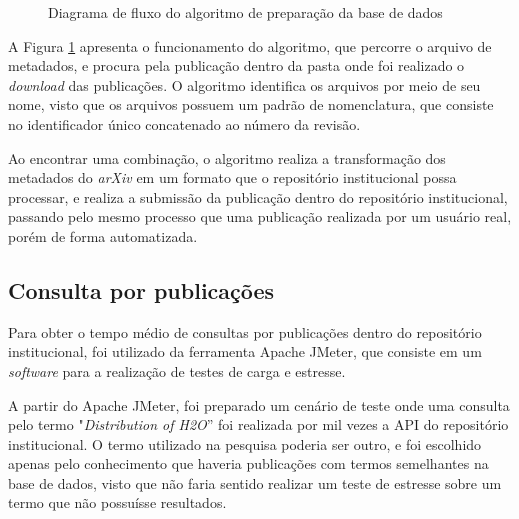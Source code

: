 \begin{figure}[H]
    \caption{Diagrama de fluxo do algoritmo de preparação da base de dados}
    \centering
    \label{fig:pseudo-algoritmo}
\end{figure}

A Figura \ref{fig:pseudo-algoritmo} apresenta o funcionamento do algoritmo, que percorre o arquivo
de metadados, e procura pela publicação dentro da pasta onde foi realizado o \emph{download} das publicações.
O algoritmo identifica os arquivos por meio de seu nome, visto que os arquivos possuem um padrão de nomenclatura,
que consiste no identificador único concatenado ao número da revisão.

Ao encontrar uma combinação, o algoritmo realiza a transformação dos metadados do
\emph{arXiv} em um formato que o repositório institucional possa processar, e realiza
a submissão da publicação dentro do repositório institucional, passando pelo mesmo
processo que uma publicação realizada por um usuário real, porém de forma automatizada.

\subsection{Consulta por publicações}

Para obter o tempo médio de consultas por publicações dentro do repositório
institucional, foi utilizado da ferramenta Apache JMeter, que consiste em um
\emph{software} para a realização de testes de carga e estresse.

A partir do Apache JMeter, foi preparado um cenário de teste onde uma consulta
pelo termo "\emph{Distribution of H2O}'' foi realizada por mil vezes a API do
repositório institucional. O termo utilizado na pesquisa poderia ser outro, e
foi escolhido apenas pelo conhecimento que haveria publicações com termos semelhantes
na base de dados, visto que não faria sentido realizar um teste de estresse sobre um termo
que não possuísse resultados.

